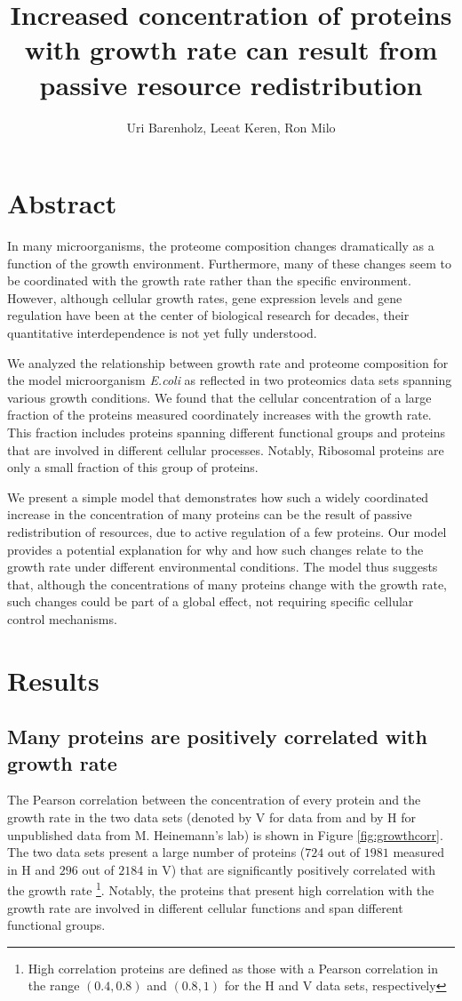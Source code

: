 \documentclass[a4paper,landscape,titlepage,17pt]{extarticle}
\title{\Huge Increased concentration of proteins with growth rate can result from passive resource redistribution}
\author{\Large Uri Barenholz, Leeat Keren, Ron Milo}
\affil{The Weizmann Institute of Science, Rehovot, Israel}
\date{}
\begin{document}
\maketitle
\section*{\LARGE Abstract}
In many microorganisms, the proteome composition changes dramatically as a function of the growth environment.
Furthermore, many of these changes seem to be coordinated with the growth rate rather than the specific environment.
However, although cellular growth rates, gene expression levels and gene regulation have been at the center of biological research for decades, their quantitative interdependence is not yet fully understood.

We analyzed the relationship between growth rate and proteome composition for the model microorganism \emph{E.coli} as reflected in two proteomics data sets spanning various growth conditions.
We found that the cellular concentration of a large fraction of the proteins measured coordinately increases with the growth rate.
This fraction includes proteins spanning different functional groups and proteins that are involved in different cellular processes.
Notably, Ribosomal proteins are only a small fraction of this group of proteins.

We present a simple model that demonstrates how such a widely coordinated increase in the concentration of many proteins can be the result of passive redistribution of resources, due to active regulation of a few proteins.
Our model provides a potential explanation for why and how such changes relate to the growth rate under different environmental conditions.
The model thus suggests that, although the concentrations of many proteins change with the growth rate, such changes could be part of a global effect, not requiring specific cellular control mechanisms.
\clearpage        
\section*{\LARGE Results}
\subsection*{Many proteins are positively correlated with growth rate}
The Pearson correlation between the concentration of every protein and the growth rate in the two data sets (denoted by V for data from \parencite{Valgepea2013} and by H for unpublished data from M. Heinemann's lab) is shown in Figure \ref{fig:growthcorr}.
The two data sets present a large number of proteins ($724$ out of $1981$ measured in H and $296$ out of $2184$ in V) that are significantly positively correlated with the growth rate \footnote{High correlation proteins are defined as those with a Pearson correlation in the range $(0.4,0.8)$ and $(0.8,1)$ for the H and V data sets, respectively}.
Notably, the proteins that present high correlation with the growth rate are involved in different cellular functions and span different functional groups.
\end{document}
